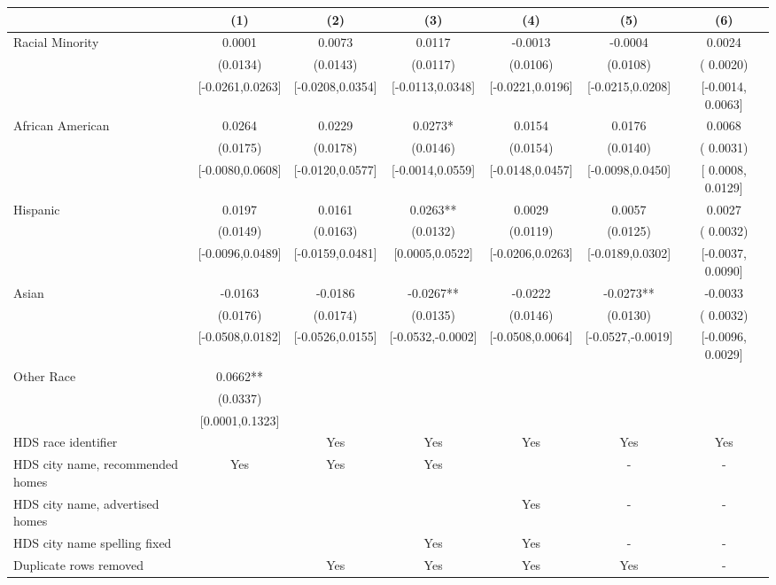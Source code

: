 \begin{table}[htbp]
{\begin{tabular}{l*{6}{c}}
                    \cmidrule(lr){2-2}\cmidrule(lr){3-3}\cmidrule(lr){4-4}\cmidrule(lr){5-5}\cmidrule(lr){6-6}\cmidrule(lr){7-7}
                    &\multicolumn{1}{c}{(1)}   &\multicolumn{1}{c}{(2)}   &\multicolumn{1}{c}{(3)}   &\multicolumn{1}{c}{(4)}   &\multicolumn{1}{c}{(5)}   &\multicolumn{1}{c}{(6)}\\
\midrule
Racial Minority & 0.0001 & 0.0073 & 0.0117 & -0.0013 & -0.0004 & 0.0024 \\
 & (0.0134) & (0.0143) & (0.0117) & (0.0106) & (0.0108) & ( 0.0020) \\
 & [-0.0261,0.0263] & [-0.0208,0.0354] & [-0.0113,0.0348] & [-0.0221,0.0196] & [-0.0215,0.0208] & [-0.0014,  0.0063] \\
\midrule
African American & 0.0264 & 0.0229 & 0.0273* & 0.0154 & 0.0176 & 0.0068\sym{**} \\
 & (0.0175) & (0.0178) & (0.0146) & (0.0154) & (0.0140) & ( 0.0031) \\
 & [-0.0080,0.0608] & [-0.0120,0.0577] & [-0.0014,0.0559] & [-0.0148,0.0457] & [-0.0098,0.0450] & [ 0.0008,  0.0129] \\
Hispanic & 0.0197 & 0.0161 & 0.0263** & 0.0029 & 0.0057 & 0.0027 \\
 & (0.0149) & (0.0163) & (0.0132) & (0.0119) & (0.0125) & ( 0.0032) \\
 & [-0.0096,0.0489] & [-0.0159,0.0481] & [0.0005,0.0522] & [-0.0206,0.0263] & [-0.0189,0.0302] & [-0.0037,  0.0090] \\
Asian & -0.0163 & -0.0186 & -0.0267** & -0.0222 & -0.0273** & -0.0033 \\
 & (0.0176) & (0.0174) & (0.0135) & (0.0146) & (0.0130) & ( 0.0032) \\
 & [-0.0508,0.0182] & [-0.0526,0.0155] & [-0.0532,-0.0002] & [-0.0508,0.0064] & [-0.0527,-0.0019] & [-0.0096,  0.0029] \\
Other Race & 0.0662** &  &  &  &  &  \\
 & (0.0337) &  &  &  &  &  \\
 & [0.0001,0.1323] &  &  &  &  &  \\
\midrule
HDS race identifier & & Yes & Yes & Yes & Yes & Yes \\
HDS city name, recommended homes & Yes & Yes & Yes & & - & -\\
HDS city name, advertised homes &  &  &  & Yes & - & -\\
HDS city name spelling fixed & & & Yes & Yes & - & -\\
Duplicate rows removed &  & Yes & Yes & Yes & Yes & - \\

\end{tabular}}
\end{table}
